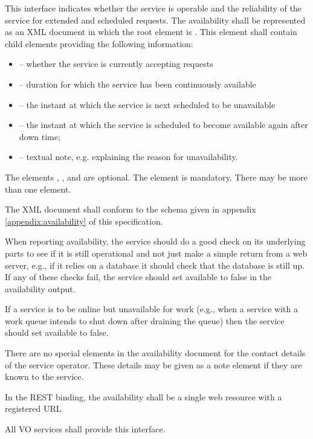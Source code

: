 \documentclass[11pt,letter]{ivoa}
\begin{document}
This interface indicates whether the service is operable and the reliability of the service for extended and scheduled requests. The availability shall be represented as an XML document in which the root element is . This element shall contain child elements providing the following information:

\begin{itemize}
\item {} -- whether the service is currently accepting requests
\item {} -- duration for which the service has been continuously available
\item {} -- the instant at which the service is next scheduled to be unavailable
\item {} -- the instant at which the service is scheduled to become available again after down time;
\item {} -- textual note, e.g. explaining the reason for unavailability. 
\end{itemize}

The elements , ,  and  are optional. The  element is mandatory. There may be more than one  element.

The XML document shall conform to the schema given in appendix \ref{appendix:availability} of this specification.

When reporting availability, the service should do a good check on its underlying parts to see if it is still operational and not just make a simple return from a web server, e.g., if it relies on a database it should check that the database is still up. If any of these checks fail, the service should set available to false in the availability output.

If a service is to be online but unavailable for work (e.g., when a service with a work queue intends to shut down after draining the queue) then the service should set available to false.

There are no special elements in the availability document for the contact details of the service operator. These details may be given as a note element if they are known to the service.

In the REST binding, the availability shall be a single web resource with a registered URL

All VO services shall provide this interface. 
\end{document}
